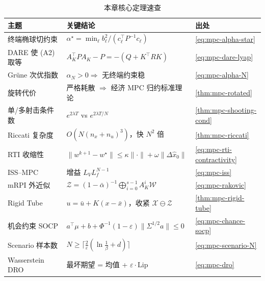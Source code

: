 \begin{table}[H]\centering\small
\caption{本章核心定理速查}
\label{tab:mpc-summary}
\begin{tabular}{lll}
\toprule
主题 & 关键结论 & 出处 \\
\midrule
终端椭球切约束 & $\alpha^\star=\min_\ell b_\ell^2/(c_\ell^\top P^{-1}c_\ell)$ & \cref{eq:mpc-alpha-star} \\
DARE 使 (A2) 取等 & $A_K^\top PA_K-P=-(Q+K^\top RK)$ & \cref{eq:mpc-dare-lyap} \\
Grüne 次优指数 & $\alpha_N>0\Rightarrow$ 无终端约束稳 & \cref{eq:mpc-alpha-N} \\
旋转代价 & 严格耗散 $\Rightarrow$ 经济 MPC 归约标准理论 & \cref{thm:mpc-rotated} \\
单/多射击条件数 & $e^{2\lambda T}$ vs $e^{2\lambda T/N}$ & \cref{thm:mpc-shooting-cond} \\
Riccati 复杂度 & $O(N(n_x+n_u)^3)$，快 $N^2$ 倍 & \cref{thm:mpc-riccati} \\
RTI 收缩性 & $\|w^{k+1}-w^\star\|\le\kappa\|\cdot\|+\omega\|\Delta\hat x_0\|$ & \cref{eq:mpc-rti-contractivity} \\
ISS--MPC & 增益 $L_VL_f^{N-1}$ & \cref{eq:mpc-iss} \\
mRPI 外近似 & $\mathcal Z=(1-\bar\alpha)^{-1}\bigoplus_{i=0}^{s-1}A_K^i\mathcal W$ & \cref{eq:mpc-rakovic} \\
Rigid Tube & $u=\bar u+K(x-\bar x)$，收紧 $\mathcal X\ominus\mathcal Z$ & \cref{thm:mpc-rigid-tube} \\
机会约束 SOCP & $a^\top\mu+b+\Phi^{-1}(1-\varepsilon)\|\Sigma^{1/2}a\|\le0$ & \cref{eq:mpc-chance-socp} \\
Scenario 样本数 & $N\ge\lceil\tfrac2\varepsilon(\ln\tfrac1\beta+d)\rceil$ & \cref{eq:mpc-scenario-N} \\
Wasserstein DRO & 最坏期望 = 均值 + $\varepsilon\cdot\mathrm{Lip}$ & \cref{eq:mpc-dro} \\
\bottomrule
\end{tabular}
\end{table}

